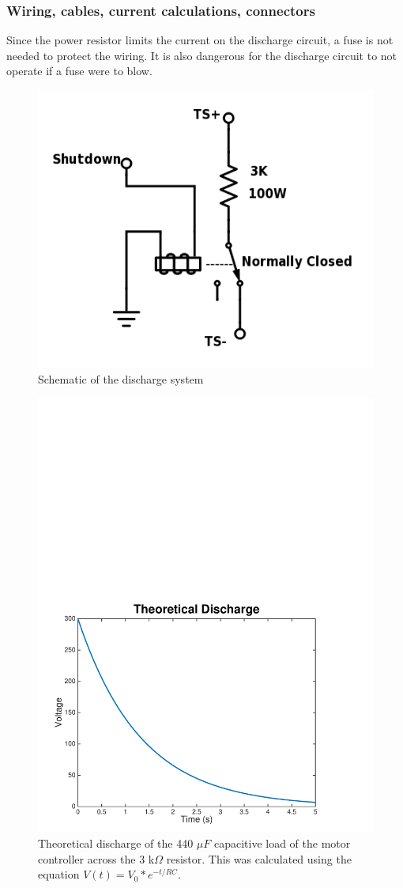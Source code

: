 \documentclass{article}
\begin{document}
\subsubsection{Wiring, cables, current calculations, connectors}

Since the power resistor limits the current on the discharge circuit, a fuse is not needed to protect the wiring. It is also dangerous for the discharge circuit to not operate if a fuse were to blow. 

\begin{figure}[H]
    \centering
    \includegraphics[width = 0.7 \textwidth]{Discharge.png}
    \caption{Schematic of the discharge system}
    \label{discharge_schem}
\end{figure}

\begin{figure}[H]
    \centering
    \includegraphics[width = 0.7 \textwidth]{discharge_voltage}
    \caption{Theoretical discharge of the 440 $\mu F$ capacitive load of the motor controller across the 3 k$\Omega$ resistor. This was calculated using the equation $V(t) = V_{0} * e^{-t/RC}$.}
    \label{discharge_voltage}
\end{figure}
\end{document}
